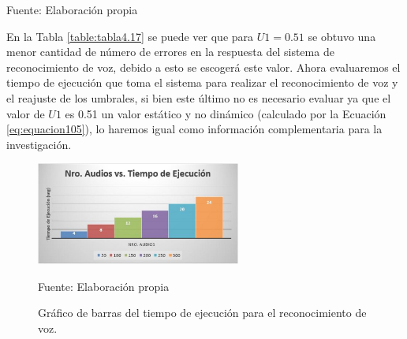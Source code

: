 \begin{center}
\begin{table}[H]
\centering
\caption{\small{Comparación de numero de errores entre U1 = U y U1 = 0.51.}}
\label{table:tabla4.17}
\vskip 0.2cm
\begin{center}
\vskip 0.2cm
{\small{Fuente: Elaboración propia}}
\end{center}
\end{table}
\end{center}

En la Tabla \ref{table:tabla4.17} se puede ver que para $U1 = 0.51$ se obtuvo una menor cantidad de número de errores en la respuesta del sistema de reconocimiento de voz, debido a esto se escogerá este valor.
\vskip 0.5cm
Ahora evaluaremos el tiempo de ejecución que toma el sistema para realizar el reconocimiento de voz y el reajuste de los umbrales, si bien este último no es necesario evaluar ya que el valor de $U1$ es 0.51 un valor estático y no dinámico (calculado por la Ecuación \eqref{eq:equacion105}), lo haremos igual como información complementaria para la investigación.

\begin{figure}[H]
\captionsetup{justification=centering}
\begin{center}
\includegraphics[width=0.6\textwidth]{Imagenes/Cap4/image005}
\end{center}
\begin{center}
\vskip -0.5cm
\caption{\small{Gráfico de barras del tiempo de ejecución para el reconocimiento de voz.}}
\label{fig:figura4.5}
{\small{Fuente: Elaboración propia}}
\end{center}
\end{figure}

